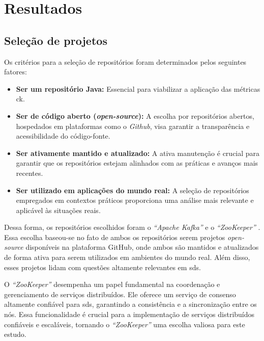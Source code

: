 \chapter{Resultados}
\label{chapter:results}

\section{Seleção de projetos}

Os critérios para a seleção de repositórios foram determinados pelos seguintes fatores:

\begin{itemize}
    \item \textbf{Ser um repositório Java:} Essencial para viabilizar a aplicação das métricas \gls{ck}.
    \item \textbf{Ser de código aberto (\textit{open-source}):} A escolha por repositórios abertos, hospedados em plataformas como o \textit{Github}, visa garantir a transparência e acessibilidade do código-fonte.
    \item \textbf{Ser ativamente mantido e atualizado:} A ativa manutenção é crucial para garantir que os repositórios estejam alinhados com as práticas e avanços mais recentes.
    \item \textbf{Ser utilizado em aplicações do mundo real:} A seleção de repositórios empregados em contextos práticos proporciona uma análise mais relevante e aplicável às situações reais.
\end{itemize}

Dessa forma, os repositórios escolhidos foram o \textit{``Apache Kafka''} \cite{KafkaGitHub} e o \textit{``ZooKeeper''} \cite{ZookeeperGitHub}. Essa escolha baseou-se no fato de ambos os repositórios serem projetos \textit{open-source} disponíveis na plataforma GitHub, onde ambos são mantidos e atualizados de forma ativa para serem utilizados em ambientes do mundo real. Além disso, esses projetos lidam com questões altamente relevantes em \gls{sds}.

O \textit{``ZooKeeper''} desempenha um papel fundamental na coordenação e gerenciamento de serviços distribuídos. Ele oferece um serviço de consenso altamente confiável para \gls{sds}, garantindo a consistência e a sincronização entre os nós. Essa funcionalidade é crucial para a implementação de serviços distribuídos confiáveis e escaláveis, tornando o \textit{``ZooKeeper''} uma escolha valiosa para este estudo.

